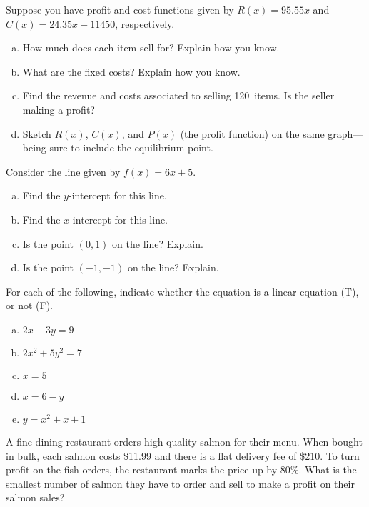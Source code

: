 \documentclass[11pt,letterpaper]{article}
\begin{document}
	
\prob	 Suppose you have profit and cost functions given by $R(x)= 95.55x$ and $C(x)= 24.35x + 11450$, respectively. 
	\begin{enumerate}[(a)]
	\item How much does each item sell for? Explain how you know.
	\item What are the fixed costs? Explain how you know.
	\item Find the revenue and costs associated to selling 120~items. Is the seller making a profit?
	\item Sketch $R(x)$, $C(x)$, and $P(x)$ (the profit function) on the same graph---being sure to include the equilibrium point. 
	\end{enumerate} \pspace





\newpage





\prob Consider the line given by $f(x)= 6x + 5$.
        \begin{enumerate}[(a)]
        \item Find the $y$-intercept for this line. 
        \item Find the $x$-intercept for this line. 
        \item Is the point $(0, 1)$ on the line? Explain. 
        \item Is the point $(-1, -1)$ on the line? Explain. 
        \end{enumerate} \pspace


\prob For each of the following, indicate whether the equation is a linear equation (T), or not (F). 
	\begin{enumerate}[(a)]
	\item  $2x - 3y= 9$
	\item  $2x^2 + 5y^2= 7$
	\item  $x= 5$
	\item  $x= 6- y$
	\item  $y= x^2 + x + 1$
	\end{enumerate} \pspace


\prob A fine dining restaurant orders high-quality salmon for their menu. When bought in bulk, each salmon costs \$11.99 and there is a flat delivery fee of \$210. To turn profit on the fish orders, the restaurant marks the price up by 80\%. What is the smallest number of salmon they have to order and sell to make a profit on their salmon sales? \pspace 
\end{document}
